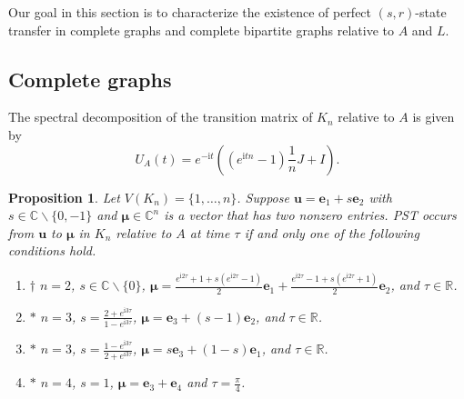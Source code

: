 \documentclass{article}
\numberwithin{equation}{section}
\newtheorem{prop}[lemma]{Proposition}
\newcommand{\be}{\mathbf e}
\newcommand{\bu}{\mathbf u}
\newcommand{\bmu}{{\boldsymbol{\mu}}}
\def\C{\mathbb{C}}
\def\R{\mathbb{R}}
\def\ii{\mathrm{i}}
\begin{document}
{Our goal in this section is to characterize the existence of perfect $(s,r)$-state transfer in complete graphs and complete bipartite graphs relative to $A$ and $L$.


\subsection{Complete graphs}


The spectral decomposition of the transition matrix of $K_n$ relative to $A$ is given by 
\begin{equation}
\label{Eq:kn}
U_A(t)=e^{-\ii t}\left((e^{\ii tn}-1)\frac{1}{n}J+I\right).
\end{equation}

\begin{prop}
\label{Cor:knPST}
Let $V(K_n)=\{1,\ldots,n\}$. Suppose $\bu=\be_1+s\be_2$ with $s\in\C\backslash\{0,-1\}$ and $\bmu\in\C^n$ is a vector that has two nonzero entries. PST occurs from $\bu$ to $\bmu$ in $K_n$ relative to $A$ at time $\tau$ if and only one of the following conditions hold.
\begin{enumerate}
\item $\dagger$  $n=2$, $s\in\C\backslash\{0\}$, $\bmu=\frac{e^{\ii2\tau}+1+s(e^{\ii2\tau}-1)}{2}\be_1+\frac{e^{\ii2\tau}-1+s(e^{\ii2\tau}+1)}{2}\be_2$, and $\tau\in\R$.
\item $*$ $n=3$, $s=\frac{2+e^{\ii3\tau}}{1-e^{\ii 3\tau}}$, $\bmu=\be_3+(s-1)\be_2$, and $\tau\in\R$.
\item $*$ $n=3$, $s=\frac{1-e^{\ii 3\tau}}{2+e^{\ii 3\tau}}$, $\bmu=s\be_3+(1-s)\be_1$, and $\tau\in\R$.
\item $*$ $n=4$, $s=1$, $\bmu=\be_3+\be_4$ and $\tau=\frac{\pi}{4}$.
\end{enumerate}
\end{prop}

}
\end{document}
